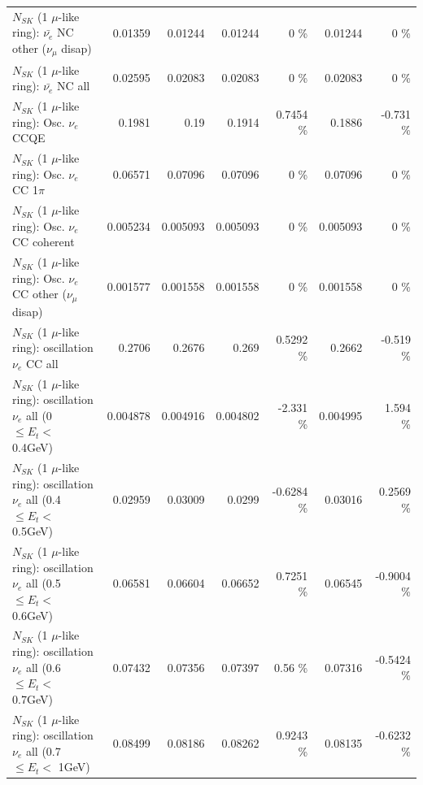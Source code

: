 \begin{table}
\begin{tabular}{| l | r | r | r  r | r  r |}
          $N_{SK}$ (1 $\mu$-like ring): $\bar{\nu_e}$ NC other ($\nu_\mu$ disap) &         0.01359 &         0.01244 &         0.01244 &        0 \%  &         0.01244 &        0 \%  \\ 
                            $N_{SK}$ (1 $\mu$-like ring): $\bar{\nu_{e}}$ NC all &         0.02595 &         0.02083 &         0.02083 &        0 \%  &         0.02083 &        0 \%  \\ 
\hline
\hline
\hline
                                 $N_{SK}$ (1 $\mu$-like ring): Osc. $\nu_e$ CCQE &          0.1981 &            0.19 &          0.1914 &   0.7454 \%  &          0.1886 &   -0.731 \%  \\ 
                            $N_{SK}$ (1 $\mu$-like ring): Osc. $\nu_e$ CC 1$\pi$ &         0.06571 &         0.07096 &         0.07096 &        0 \%  &         0.07096 &        0 \%  \\ 
                          $N_{SK}$ (1 $\mu$-like ring): Osc. $\nu_e$ CC coherent &        0.005234 &        0.005093 &        0.005093 &        0 \%  &        0.005093 &        0 \%  \\ 
           $N_{SK}$ (1 $\mu$-like ring): Osc. $\nu_e$ CC other ($\nu_\mu$ disap) &        0.001577 &        0.001558 &        0.001558 &        0 \%  &        0.001558 &        0 \%  \\ 
                        $N_{SK}$ (1 $\mu$-like ring): oscillation $\nu_e$ CC all &          0.2706 &          0.2676 &           0.269 &   0.5292 \%  &          0.2662 &   -0.519 \%  \\ 
\hline
$N_{SK}$ (1 $\mu$-like ring): oscillation $\nu_{e}$ all (0 $\leq E_{t} <$ 0.4GeV) &        0.004878 &        0.004916 &        0.004802 &   -2.331 \%  &        0.004995 &    1.594 \%  \\ 
$N_{SK}$ (1 $\mu$-like ring): oscillation $\nu_{e}$ all (0.4 $\leq E_{t} <$ 0.5GeV) &         0.02959 &         0.03009 &          0.0299 &  -0.6284 \%  &         0.03016 &   0.2569 \%  \\ 
$N_{SK}$ (1 $\mu$-like ring): oscillation $\nu_{e}$ all (0.5 $\leq E_{t} <$ 0.6GeV) &         0.06581 &         0.06604 &         0.06652 &   0.7251 \%  &         0.06545 &  -0.9004 \%  \\ 
$N_{SK}$ (1 $\mu$-like ring): oscillation $\nu_{e}$ all (0.6 $\leq E_{t} <$ 0.7GeV) &         0.07432 &         0.07356 &         0.07397 &     0.56 \%  &         0.07316 &  -0.5424 \%  \\ 
$N_{SK}$ (1 $\mu$-like ring): oscillation $\nu_{e}$ all (0.7 $\leq E_{t} <$ 1GeV) &         0.08499 &         0.08186 &         0.08262 &   0.9243 \%  &         0.08135 &  -0.6232 \%  \\ 

\end{tabular}
\end{table}
